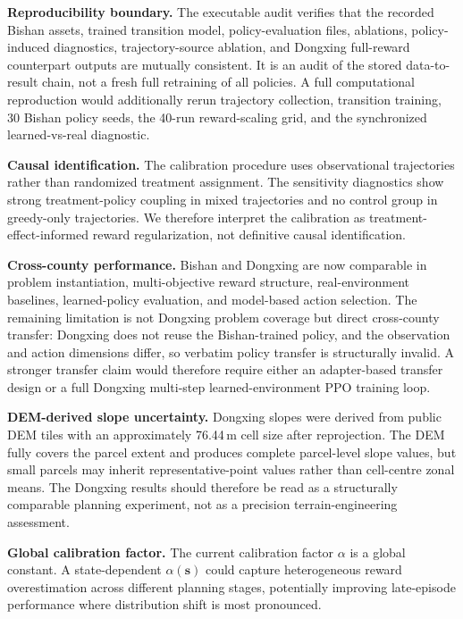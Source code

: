 \documentclass[11pt]{article}
\begin{document}
\textbf{Reproducibility boundary.} The executable audit verifies that the recorded Bishan assets, trained transition model, policy-evaluation files, ablations, policy-induced diagnostics, trajectory-source ablation, and Dongxing full-reward counterpart outputs are mutually consistent. It is an audit of the stored data-to-result chain, not a fresh full retraining of all policies. A full computational reproduction would additionally rerun trajectory collection, transition training, 30 Bishan policy seeds, the 40-run reward-scaling grid, and the synchronized learned-vs-real diagnostic.

\textbf{Causal identification.} The calibration procedure uses observational trajectories rather than randomized treatment assignment. The sensitivity diagnostics show strong treatment-policy coupling in mixed trajectories and no control group in greedy-only trajectories. We therefore interpret the calibration as treatment-effect-informed reward regularization, not definitive causal identification.

\textbf{Cross-county performance.} Bishan and Dongxing are now comparable in problem instantiation, multi-objective reward structure, real-environment baselines, learned-policy evaluation, and model-based action selection. The remaining limitation is not Dongxing problem coverage but direct cross-county transfer: Dongxing does not reuse the Bishan-trained policy, and the observation and action dimensions differ, so verbatim policy transfer is structurally invalid. A stronger transfer claim would therefore require either an adapter-based transfer design or a full Dongxing multi-step learned-environment PPO training loop.

\textbf{DEM-derived slope uncertainty.} Dongxing slopes were derived from public DEM tiles with an approximately 76.44\,m cell size after reprojection. The DEM fully covers the parcel extent and produces complete parcel-level slope values, but small parcels may inherit representative-point values rather than cell-centre zonal means. The Dongxing results should therefore be read as a structurally comparable planning experiment, not as a precision terrain-engineering assessment.

\textbf{Global calibration factor.} The current calibration factor $\alpha$ is a global constant. A state-dependent $\alpha(\mathbf{s})$ could capture heterogeneous reward overestimation across different planning stages, potentially improving late-episode performance where distribution shift is most pronounced.
\end{document}
